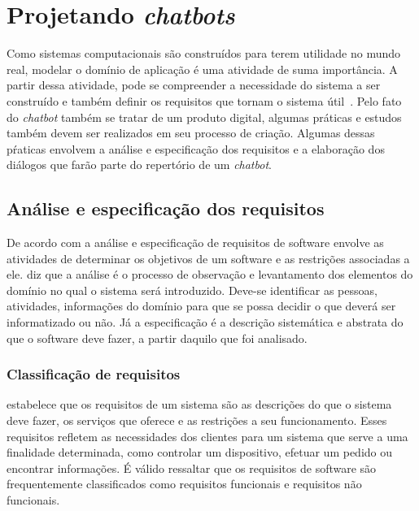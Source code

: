 \section{Projetando \textit{chatbots}}\label{cap:02:sec:05:projeto}

Como sistemas computacionais são construídos para terem utilidade no mundo real, modelar o domínio de aplicação é uma atividade de suma importância.
A partir dessa atividade, pode se compreender a necessidade do sistema a ser construído e também definir os requisitos que tornam o sistema útil~\cite{ReqJair}. 
Pelo fato do \textit{chatbot} também se tratar de um produto digital, algumas práticas e estudos também devem ser realizados em seu processo de criação. Algumas dessas pŕaticas envolvem a análise e especificação dos requisitos e a elaboração dos diálogos que farão parte do repertório de um \textit{chatbot}.

\subsection{Análise e especificação dos requisitos}

De acordo com  a análise e especificação de requisitos de software envolve as atividades de determinar os objetivos de um software e as restrições associadas a ele.
 diz que a análise é o processo de observação e levantamento dos elementos do domínio no qual o sistema será introduzido. Deve-se identificar  as pessoas, atividades, informações do domínio para que se possa decidir o que deverá ser informatizado ou não.
Já a especificação é a descrição sistemática e abstrata do que o software deve fazer, a partir daquilo que foi analisado.

\subsubsection{Classificação de requisitos}\label{cap:02:sec:05:projeto:classificacao-requisitos}

 estabelece que os requisitos de um sistema são as descrições do que o sistema deve fazer, os serviços que oferece e as restrições a seu funcionamento.
Esses requisitos refletem as necessidades dos clientes para um sistema que serve a uma finalidade determinada, como controlar um dispositivo, efetuar um pedido ou encontrar informações.
É válido ressaltar que os requisitos de software são frequentemente classificados como requisitos funcionais e requisitos não funcionais.

